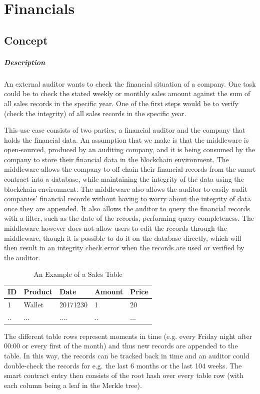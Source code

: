 \section{Financials}

\subsection{Concept}
\subparagraph{Description}
An external auditor wants to check the financial situation of a company. One task could be to check the stated weekly or monthly sales amount against the sum of all sales records in the specific year. One of the first steps would be to verify (check the integrity) of all sales records in the specific year.

This use case consists of two parties, a financial auditor and the company that holds the financial data. An assumption that we make is that the middleware is open-sourced, produced by an auditing company, and it is being consumed by the company to store their financial data in the blockchain environment. The middleware allows the company to off-chain their financial records from the smart contract into a database, while maintaining the integrity of the data using the blockchain environment. The middleware also allows the auditor to easily audit companies’ financial records without having to worry about the integrity of data once they are appended. It also allows the auditor to query the financial records with a filter, such as the date of the records, performing query completeness. The middleware however does not allow users to edit the records through the middleware, though it is possible to do it on the database directly, which will then result in an integrity check error when the records are used or verified by the auditor.


\begin{table}
	\centering
	\caption{An Example of a Sales Table}
    \begin{tabular}{| l | l | l | l | l |}
    \hline
    ID & Product & Date & Amount & Price \\ \hline
    1 & Wallet & 20171230 & 1 & 20 \\ \hline
    .. & ... & .... & .. & ... \\ \hline
    \end{tabular}
\end{table}

The different table rows represent moments in time (e.g. every Friday night after 00:00 or every first of the month) and thus new records are appended to the table. In this way, the records can be tracked back in time and an auditor could double-check the records for e.g. the last 6 months or the last 104 weeks. The smart contract entry then consists of the root hash over every table row (with each column being a leaf in the Merkle tree).

